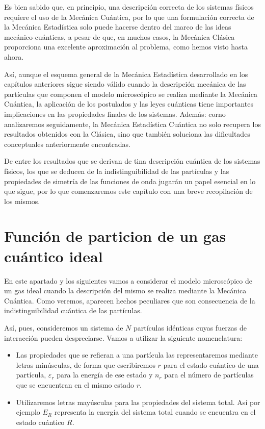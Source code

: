 Es bien sabido que, en principio, una descripción correcta de los sistemas físicos requiere el uso de la Mecánica Cuántica, por lo que una formulación correcta de la Mecánica Estadística solo puede hacerse dentro del marco de las ideas mecánico-cuánticas, a pesar de que, en muchos casos, la Mecánica Clásica proporciona una excelente aproximación al problema, como hemos visto hasta ahora.

Así, aunque el esquema general de la Mecánica Estadística desarrollado en los capítulos anteriores sigue siendo válido cuando la descripción mecánica de las partículas que componen el modelo microscópico se realiza mediante la Mecánica Cuántica, la aplicación de los postulados y las leyes cuánticas tiene importantes implicaciones en las propiedades finales de los sistemas. Además: corno analizaremos seguidamente, la Mecánica Estadística Cuántica no solo recupera los resultados obtenidos con la Clásica, sino que también soluciona las dificultades conceptuales anteriormente encontradas.

De entre los resultados que se derivan de tina descripción cuántica de los sistemas físicos, los que se deducen de la indistinguibilidad de las partículas y las propiedades de simetría de las funciones de onda jugarán un papel esencial en lo que sigue, por lo que comenzaremos este capítulo con una breve recopilación de los mismos.

\newpage
\section{Función de particion de un gas cuántico ideal}

En este apartado y los siguientes vamos a considerar el modelo microscópico de un gas ideal cuando la descripción del mismo se realiza mediante la Mecánica Cuántica.
Como veremos, aparecen hechos peculiares que son consecuencia de la indistinguibilidad cuántica de las partículas.

Así, pues, consideremos un sistema de $N$ partículas idénticas cuyas fuerzas de interacción pueden despreciarse. Vamos a utilizar la siguiente nomenclatura:

\begin{itemize}
	\item Las propiedades que se refieran a una partícula las representaremos mediante letras minúsculas, de forma que escribiremos $r$ para el estado cuántico de una partícula, $\varepsilon_r$ para la energía de ese estado y $n_r$ para el número de partículas que se encuentran en el mismo estado $r$.
	
	\item Utilizaremos letras mayúsculas para las propiedades del sistema total.
	Así por ejemplo $E_R$ representa la energía del sistema total cuando se encuentra en el estado cuántico $R$.
\end{itemize}

